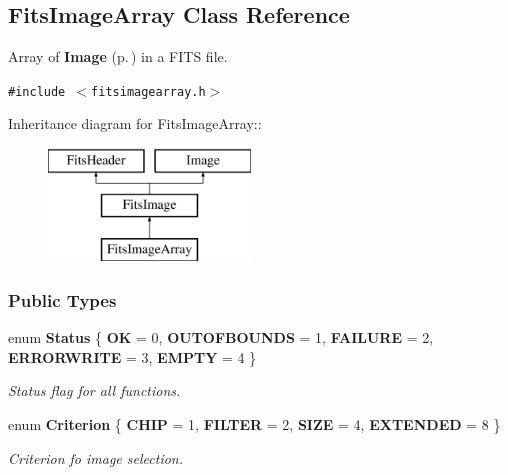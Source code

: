 \subsection{Fits\-Image\-Array  Class Reference}
\label{class_fitsimagearray}
Array of {\bf Image} {\rm (p.\,\pageref{class_image})} in a FITS file. 


{\tt \#include $<$fitsimagearray.h$>$}

Inheritance diagram for Fits\-Image\-Array::\begin{figure}[H]
\begin{center}
\leavevmode
\includegraphics[height=3cm]{class_fitsimagearray}
\end{center}
\end{figure}
\subsubsection*{Public Types}
\begin{CompactItemize}
\item 
enum {\bf Status} \{ {\bf OK} =  0, 
{\bf OUTOFBOUNDS} =  1, 
{\bf FAILURE} =  2, 
{\bf ERRORWRITE} =  3, 
{\bf EMPTY} =  4
 \}
\begin{CompactList}\small\item\em Status flag for all functions.\item\end{CompactList}\item 
enum {\bf Criterion} \{ {\bf CHIP} =  1, 
{\bf FILTER} =  2, 
{\bf SIZE} =  4, 
{\bf EXTENDED} =  8
 \}
\begin{CompactList}\small\item\em Criterion fo image selection.\item\end{CompactList}\end{CompactItemize}
